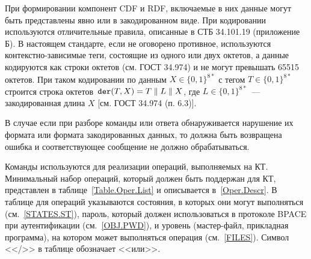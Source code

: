 При формировании компонент CDF и RDF, включаемые в них данные могут быть 
представлены явно или в закодированном виде. При кодировании используются 
отличительные правила, описанные в СТБ 34.101.19 (приложение Б). В 
настоящем стандарте, если не оговорено противное, используются 
контекстно-зависимые теги, состоящие из одного или двух октетов, а данные 
кодируются как строки октетов (см. ГОСТ 34.974) и не могут превышать 65515 
октетов. При таком кодировании по данным $X\in\{0,1\}^{8*}$ 
с тегом $T\in\{0,1\}^{8*}$ строится строка 
октетов~$\texttt{der}(T, X) = T \parallel L \parallel X$, 
где $L\in\{0,1\}^{8*}$~--- 
закодированная длина $X$ [см. ГОСТ 34.974 (п. 6.3)]. 

В случае если при разборе команды или ответа обнаруживается нарушение их 
формата или формата закодированных данных, то должна быть возвращена 
ошибка и соответствующее сообщение не должно обрабатываться. 

Команды используются для реализации операций, выполняемых на КТ.
Минимальный набор операций, который должен быть поддержан для КТ,
представлен в таблице~\ref{Table.Oper.List} и описывается
в~\ref{Oper.Descr}. 
В таблице для операций указываются состояния, 
в которых они могут выполняться (см.~\ref{STATES.ST}),
пароль, который должен использоваться 
в протоколе BPACE при аутентификации (см.~\ref{OBJ.PWD}), 
и уровень (мастер-файл, прикладная программа), 
на котором может выполняться операция 
(см.~\ref{FILES}).
Символ <</>> в таблице обозначает <<или>>.


